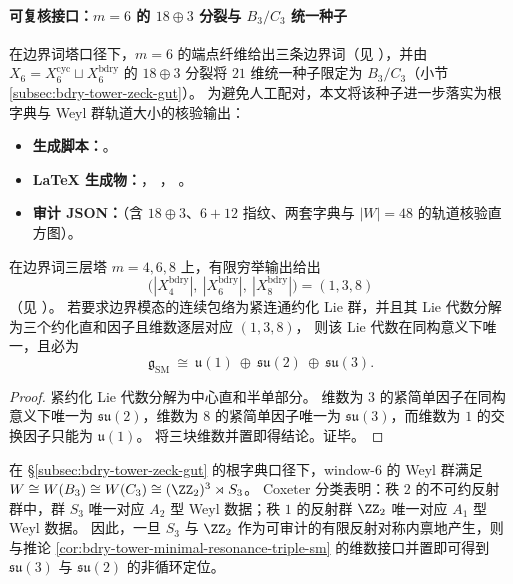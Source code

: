 \paragraph{可复核接口：\(m=6\) 的 \(18\oplus 3\) 分裂与 \(B_3/C_3\) 统一种子}
在边界词塔口径下，\(m=6\) 的端点纤维给出三条边界词（见 \texttt{}），并由 \(X_6=X_6^{\mathrm{cyc}}\sqcup X_6^{\mathrm{bdry}}\) 的 \(18\oplus 3\) 分裂将 \(21\) 维统一种子限定为 \(B_3/C_3\)（小节 \ref{subsec:bdry-tower-zeck-gut}）。
为避免人工配对，本文将该种子进一步落实为根字典与 Weyl 群轨道大小的核验输出：
\begin{itemize}
  \item \textbf{生成脚本：}\texttt{}。
  \item \textbf{LaTeX 生成物：}\texttt{}，
  \texttt{}，
  \texttt{}。
  \item \textbf{审计 JSON：}\texttt{}（含 \(18\oplus 3\)、\(6+12\) 指纹、两套字典与 \(|W|=48\) 的轨道核验直方图）。
\end{itemize}

\begin{corollary}\label{cor:bdry-tower-minimal-resonance-triple-sm}
在边界词三层塔 \(m=4,6,8\) 上，有限穷举输出给出
\[
\bigl(|X^{\mathrm{bdry}}_4|,\ |X^{\mathrm{bdry}}_6|,\ |X^{\mathrm{bdry}}_8|\bigr)=(1,3,8)
\]
（见 \texttt{}）。
若要求边界模态的连续包络为紧连通约化 Lie 群，并且其 Lie 代数分解为三个约化直和因子且维数逐层对应 \((1,3,8)\)，
则该 Lie 代数在同构意义下唯一，且必为
\[
\mathfrak g_{\mathrm{SM}}\ \cong\ \mathfrak u(1)\ \oplus\ \mathfrak{su}(2)\ \oplus\ \mathfrak{su}(3).
\]
\end{corollary}
\begin{proof}
紧约化 Lie 代数分解为中心直和半单部分。
维数为 \(3\) 的紧简单因子在同构意义下唯一为 \(\mathfrak{su}(2)\)，维数为 \(8\) 的紧简单因子唯一为 \(\mathfrak{su}(3)\)，而维数为 \(1\) 的交换因子只能为 \(\mathfrak u(1)\)。
将三块维数并置即得结论。证毕。
\end{proof}

\begin{remark}\label{rem:window6-coxeter-weyl-select-su3-su2}
在 \S\ref{subsec:bdry-tower-zeck-gut} 的根字典口径下，window-\(6\) 的 Weyl 群满足
\(
W\cong W(B_3)\cong W(C_3)\cong (\ZZ_2)^3\rtimes S_3
\)。
Coxeter 分类表明：秩 \(2\) 的不可约反射群中，群 \(S_3\) 唯一对应 \(A_2\) 型 Weyl 数据；秩 \(1\) 的反射群 \(\ZZ_2\) 唯一对应 \(A_1\) 型 Weyl 数据。
因此，一旦 \(S_3\) 与 \(\ZZ_2\) 作为可审计的有限反射对称内禀地产生，则与推论 \ref{cor:bdry-tower-minimal-resonance-triple-sm} 的维数接口并置即可得到 \(\mathfrak{su}(3)\) 与 \(\mathfrak{su}(2)\) 的非循环定位。
\end{remark}

